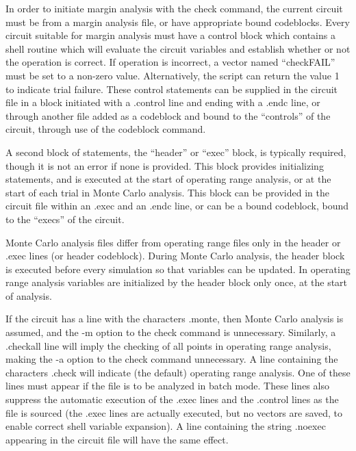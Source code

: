 In order to initiate margin analysis with the {\cb check} command, the
current circuit must be from a margin analysis file, or have
appropriate bound codeblocks.  Every circuit suitable for margin
analysis must have a control block which contains a shell routine
which will evaluate the circuit variables and establish whether or not
the operation is correct.  If operation is incorrect, a vector named
``{\et checkFAIL}'' must be set to a non-zero value.  Alternatively,
the script can return the value 1 to indicate trial failure.  These
control statements can be supplied in the circuit file in a block
initiated with a {\vt .control} line and ending with a {\vt .endc}
line, or through another file added as a codeblock and bound to the
``controls'' of the circuit, through use of the {\cb codeblock}
command.

A second block of statements, the ``header'' or ``exec'' block, is
typically required, though it is not an error if none is provided. 
This block provides initializing statements, and is executed at the
start of operating range analysis, or at the start of each trial in
Monte Carlo analysis.  This block can be provided in the circuit file
within an {\vt .exec} and an {\vt .endc} line, or can be a bound
codeblock, bound to the ``execs'' of the circuit.

Monte Carlo analysis files differ from operating range files only in
the header or {\vt .exec} lines (or header codeblock).  During Monte
Carlo analysis, the header block is executed before every simulation
so that variables can be updated.  In operating range analysis
variables are initialized by the header block only once, at the start
of analysis.

If the circuit has a line with the characters {\vt .monte}, then Monte
Carlo analysis is assumed, and the {\vt -m} option to the {\cb check}
command is unnecessary.  Similarly, a {\vt .checkall} line will imply
the checking of all points in operating range analysis, making the
{\vt -a} option to the check command unnecessary.  A line containing
the characters {\vt .check} will indicate (the default) operating
range analysis.  One of these lines must appear if the file is to be
analyzed in batch mode.  These lines also suppress the automatic
execution of the {\vt .exec} lines and the {\vt .control} lines as the
file is sourced (the {\vt .exec} lines are actually executed, but no
vectors are saved, to enable correct shell variable expansion).  A
line containing the string {\vt .noexec} appearing in the circuit file
will have the same effect.

